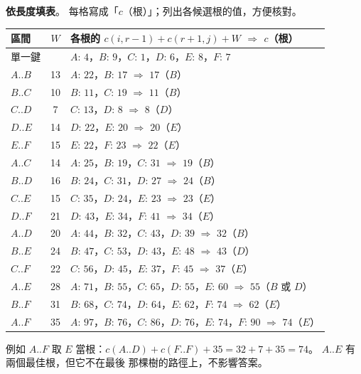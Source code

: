 \begin{pastsoln}
\textbf{依長度填表}。 每格寫成「$c$（根）」；列出各候選根的值，方便核對。
\begin{center}
\small
\begin{tabular}{lcl}
\toprule
區間 & $W$ & 各根的 $c(i, r-1) + c(r+1, j) + W$ \quad $\Rightarrow$ $c$（根） \\
\midrule
單一鍵 & & $A{:}\,4$，$B{:}\,9$，$C{:}\,1$，$D{:}\,6$，$E{:}\,8$，$F{:}\,7$ \\
$A..B$ & 13 & $A{:}\,22$，$B{:}\,17$ \quad $\Rightarrow$ $17$（$B$） \\
$B..C$ & 10 & $B{:}\,11$，$C{:}\,19$ \quad $\Rightarrow$ $11$（$B$） \\
$C..D$ & 7 & $C{:}\,13$，$D{:}\,8$ \quad $\Rightarrow$ $8$（$D$） \\
$D..E$ & 14 & $D{:}\,22$，$E{:}\,20$ \quad $\Rightarrow$ $20$（$E$） \\
$E..F$ & 15 & $E{:}\,22$，$F{:}\,23$ \quad $\Rightarrow$ $22$（$E$） \\
$A..C$ & 14 & $A{:}\,25$，$B{:}\,19$，$C{:}\,31$ \quad $\Rightarrow$ $19$（$B$） \\
$B..D$ & 16 & $B{:}\,24$，$C{:}\,31$，$D{:}\,27$ \quad $\Rightarrow$ $24$（$B$） \\
$C..E$ & 15 & $C{:}\,35$，$D{:}\,24$，$E{:}\,23$ \quad $\Rightarrow$ $23$（$E$） \\
$D..F$ & 21 & $D{:}\,43$，$E{:}\,34$，$F{:}\,41$ \quad $\Rightarrow$ $34$（$E$） \\
$A..D$ & 20 & $A{:}\,44$，$B{:}\,32$，$C{:}\,43$，$D{:}\,39$ \quad $\Rightarrow$ $32$（$B$） \\
$B..E$ & 24 & $B{:}\,47$，$C{:}\,53$，$D{:}\,43$，$E{:}\,48$ \quad $\Rightarrow$ $43$（$D$） \\
$C..F$ & 22 & $C{:}\,56$，$D{:}\,45$，$E{:}\,37$，$F{:}\,45$ \quad $\Rightarrow$ $37$（$E$） \\
$A..E$ & 28 & $A{:}\,71$，$B{:}\,55$，$C{:}\,65$，$D{:}\,55$，$E{:}\,60$ \quad $\Rightarrow$ $55$（$B$ 或 $D$） \\
$B..F$ & 31 & $B{:}\,68$，$C{:}\,74$，$D{:}\,64$，$E{:}\,62$，$F{:}\,74$ \quad $\Rightarrow$ $62$（$E$） \\
$A..F$ & 35 & $A{:}\,97$，$B{:}\,76$，$C{:}\,86$，$D{:}\,76$，$E{:}\,74$，$F{:}\,90$ \quad $\Rightarrow$ $74$（$E$） \\
\bottomrule
\end{tabular}
\end{center}
例如 $A..F$ 取 $E$ 當根：$c(A..D) + c(F..F) + 35 = 32 + 7 + 35 = 74$。 $A..E$ 有兩個最佳根，但它不在最後
那棵樹的路徑上，不影響答案。


\end{pastsoln}

